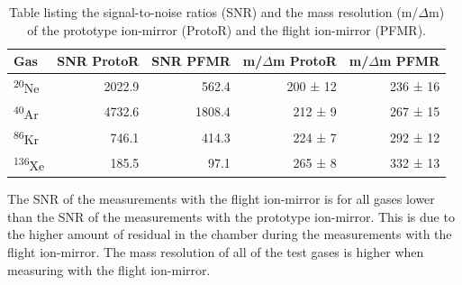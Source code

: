 	\begin{table}
		\begin{center}
		\begin{tabular}{|l|r|r|r|r|}
			\hline
			Gas						&SNR ProtoR	&SNR PFMR	&m/$\Delta$m ProtoR	&m/$\Delta$m PFMR\\
			\hline
			\textsuperscript{20}Ne	&2022.9		&562.4		&200 ± 12		&236 ± 16\\
			\textsuperscript{40}Ar	&4732.6		&1808.4		&212 ±  9		&267 ± 15\\
			\textsuperscript{86}Kr	&746.1		&414.3		&224 ±  7		&292 ± 12\\
			\textsuperscript{136}Xe	&185.5		&97.1		&265 ±  8		&332 ± 13\\
			\hline
		\end{tabular}
		\end{center}
		\caption{Table listing the signal-to-noise ratios (SNR) and the mass resolution (m/$\Delta$m) of the prototype ion-mirror (ProtoR) and the flight ion-mirror (PFMR).}
		\label{tab:refPerftab}
	\end{table}
	The SNR of the measurements with the flight ion-mirror is for all gases lower than the SNR of the measurements with the prototype ion-mirror. This is due to the higher amount of residual in the chamber during the measurements with the flight ion-mirror. The mass resolution of all of the test gases is higher when measuring with the flight ion-mirror.

	
